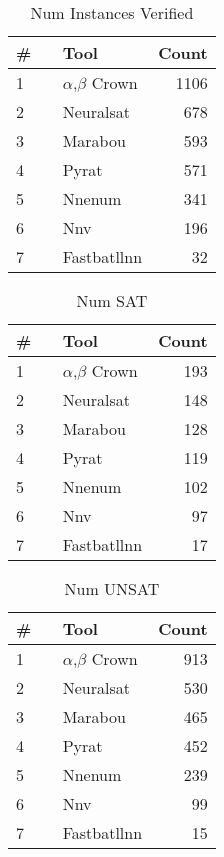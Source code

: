 \begin{table}[h]
\begin{center}
\caption{Num Instances Verified} \label{tab:stats1}
{\setlength{\tabcolsep}{2pt}
\begin{tabular}[h]{@{}llr@{}}
\toprule
\textbf{\# ~} & \textbf{Tool} & \textbf{Count}\\
\midrule
1 & $\alpha$,$\beta$ Crown & 1106 \\
2 & Neuralsat & 678 \\
3 & Marabou & 593 \\
4 & Pyrat & 571 \\
5 & Nnenum & 341 \\
6 & Nnv & 196 \\
7 & Fastbatllnn & 32 \\
\bottomrule
\end{tabular}
}
\end{center}
\end{table}




\begin{table}[h]
\begin{center}
\caption{Num SAT} \label{tab:stats2}
{\setlength{\tabcolsep}{2pt}
\begin{tabular}[h]{@{}llr@{}}
\toprule
\textbf{\# ~} & \textbf{Tool} & \textbf{Count}\\
\midrule
1 & $\alpha$,$\beta$ Crown & 193 \\
2 & Neuralsat & 148 \\
3 & Marabou & 128 \\
4 & Pyrat & 119 \\
5 & Nnenum & 102 \\
6 & Nnv & 97 \\
7 & Fastbatllnn & 17 \\
\bottomrule
\end{tabular}
}
\end{center}
\end{table}




\begin{table}[h]
\begin{center}
\caption{Num UNSAT} \label{tab:stats3}
{\setlength{\tabcolsep}{2pt}
\begin{tabular}[h]{@{}llr@{}}
\toprule
\textbf{\# ~} & \textbf{Tool} & \textbf{Count}\\
\midrule
1 & $\alpha$,$\beta$ Crown & 913 \\
2 & Neuralsat & 530 \\
3 & Marabou & 465 \\
4 & Pyrat & 452 \\
5 & Nnenum & 239 \\
6 & Nnv & 99 \\
7 & Fastbatllnn & 15 \\
\bottomrule
\end{tabular}
}
\end{center}
\end{table}



